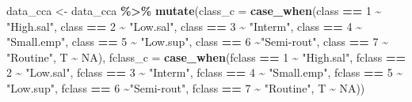 \documentclass[
]{article}
\newenvironment{Shaded}{\begin{snugshade}}{\end{snugshade}}
\newcommand{\AttributeTok}[1]{\textcolor[rgb]{0.13,0.29,0.53}{#1}}
\newcommand{\ConstantTok}[1]{\textcolor[rgb]{0.56,0.35,0.01}{#1}}
\newcommand{\DecValTok}[1]{\textcolor[rgb]{0.00,0.00,0.81}{#1}}
\newcommand{\FunctionTok}[1]{\textcolor[rgb]{0.13,0.29,0.53}{\textbf{#1}}}
\newcommand{\NormalTok}[1]{#1}
\newcommand{\OtherTok}[1]{\textcolor[rgb]{0.56,0.35,0.01}{#1}}
\newcommand{\SpecialCharTok}[1]{\textcolor[rgb]{0.81,0.36,0.00}{\textbf{#1}}}
\newcommand{\StringTok}[1]{\textcolor[rgb]{0.31,0.60,0.02}{#1}}
\begin{document}
\begin{Shaded}
\begin{Highlighting}[]
\NormalTok{data\_cca }\OtherTok{\textless{}{-}}\NormalTok{ data\_cca }\SpecialCharTok{\%\textgreater{}\%} 
  \FunctionTok{mutate}\NormalTok{(}\AttributeTok{class\_c =} \FunctionTok{case\_when}\NormalTok{(class }\SpecialCharTok{==} \DecValTok{1} \SpecialCharTok{\textasciitilde{}} \StringTok{"High.sal"}\NormalTok{,}
\NormalTok{                               class }\SpecialCharTok{==} \DecValTok{2} \SpecialCharTok{\textasciitilde{}} \StringTok{"Low.sal"}\NormalTok{,}
\NormalTok{                               class }\SpecialCharTok{==} \DecValTok{3} \SpecialCharTok{\textasciitilde{}} \StringTok{"Interm"}\NormalTok{,}
\NormalTok{                               class }\SpecialCharTok{==} \DecValTok{4} \SpecialCharTok{\textasciitilde{}} \StringTok{"Small.emp"}\NormalTok{,}
\NormalTok{                               class }\SpecialCharTok{==} \DecValTok{5} \SpecialCharTok{\textasciitilde{}} \StringTok{"Low.sup"}\NormalTok{,}
\NormalTok{                               class }\SpecialCharTok{==} \DecValTok{6} \SpecialCharTok{\textasciitilde{}}\StringTok{"Semi{-}rout"}\NormalTok{,}
\NormalTok{                               class }\SpecialCharTok{==} \DecValTok{7} \SpecialCharTok{\textasciitilde{}} \StringTok{"Routine"}\NormalTok{,}
\NormalTok{                               T }\SpecialCharTok{\textasciitilde{}} \ConstantTok{NA}\NormalTok{),}
         \AttributeTok{fclass\_c =} \FunctionTok{case\_when}\NormalTok{(fclass }\SpecialCharTok{==} \DecValTok{1} \SpecialCharTok{\textasciitilde{}} \StringTok{"High.sal"}\NormalTok{,}
\NormalTok{                               fclass }\SpecialCharTok{==} \DecValTok{2} \SpecialCharTok{\textasciitilde{}} \StringTok{"Low.sal"}\NormalTok{,}
\NormalTok{                               fclass }\SpecialCharTok{==} \DecValTok{3} \SpecialCharTok{\textasciitilde{}} \StringTok{"Interm"}\NormalTok{,}
\NormalTok{                               fclass }\SpecialCharTok{==} \DecValTok{4} \SpecialCharTok{\textasciitilde{}} \StringTok{"Small.emp"}\NormalTok{,}
\NormalTok{                               fclass }\SpecialCharTok{==} \DecValTok{5} \SpecialCharTok{\textasciitilde{}} \StringTok{"Low.sup"}\NormalTok{,}
\NormalTok{                               fclass }\SpecialCharTok{==} \DecValTok{6} \SpecialCharTok{\textasciitilde{}}\StringTok{"Semi{-}rout"}\NormalTok{,}
\NormalTok{                               fclass }\SpecialCharTok{==} \DecValTok{7} \SpecialCharTok{\textasciitilde{}} \StringTok{"Routine"}\NormalTok{,}
\NormalTok{                               T }\SpecialCharTok{\textasciitilde{}} \ConstantTok{NA}\NormalTok{))}
\end{Highlighting}
\end{Shaded}
\end{document}
